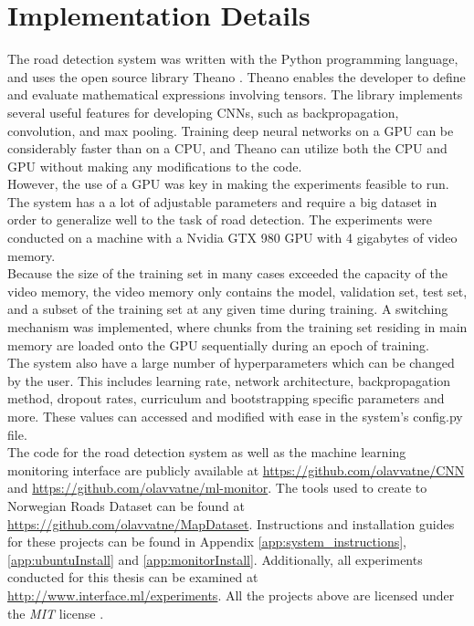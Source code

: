 \section{Implementation Details}
\label{sec:methods_implementation_details}
The road detection system was written with the Python programming language, and uses the open source library Theano \citep{bergstra_theano}. Theano enables the developer to define and evaluate mathematical expressions involving tensors. The library implements several useful features for developing \ac{CNN}s, such as backpropagation, convolution, and max pooling. Training deep neural networks on a \ac{GPU} can be considerably faster than on a \ac{CPU}, and Theano can utilize both the \ac{CPU} and \ac{GPU} without making any modifications to the code.\\

However, the use of a \ac{GPU} was key in making the experiments feasible to run. The system has a a lot of adjustable parameters and require a big dataset in order to generalize well to the task of road detection. The experiments were conducted on a machine with a Nvidia GTX 980 \ac{GPU} with 4 gigabytes of video memory. \\

Because the size of the training set in many cases exceeded the capacity of the video memory, the video memory only contains the model, validation set, test set, and a subset of the training set at any given time during training. A switching mechanism was implemented, where chunks from the training set residing in main memory are loaded onto the \ac{GPU} sequentially during an epoch of training.\\

The system also have a large number of hyperparameters which can be changed by the user. This includes learning rate, network architecture, backpropagation method, dropout rates, curriculum and bootstrapping specific parameters and more. These values can accessed and modified with ease in the system's config.py file. \\

The code for the road detection system as well as the machine learning monitoring interface are publicly available at 
\url{https://github.com/olavvatne/CNN} and \url{https://github.com/olavvatne/ml-monitor}. The tools used to create to Norwegian Roads Dataset can be found at \url{https://github.com/olavvatne/MapDataset}. Instructions and installation guides for these projects can be found in Appendix \ref{app:system_instructions}, \ref{app:ubuntuInstall} and \ref{app:monitorInstall}. Additionally, all experiments conducted for this thesis can be examined at \url{http://www.interface.ml/experiments}. All the projects above are licensed under the \emph{MIT} license .

